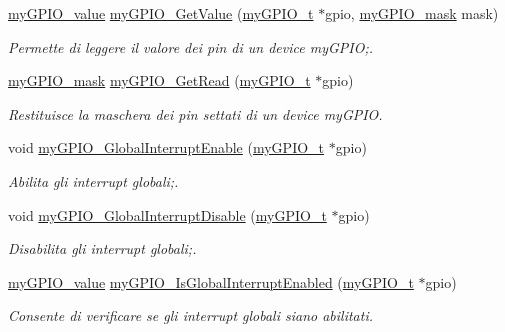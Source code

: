 \begin{DoxyCompactItemize}
\hyperlink{group__bare-metal_gaf634fe4a0e1eab8da5000b72d6ad362b}{my\+G\+P\+I\+O\+\_\+value} \hyperlink{group__bare-metal_ga2a20e519816733b90204b975edc4e212}{my\+G\+P\+I\+O\+\_\+\+Get\+Value} (\hyperlink{structmy_g_p_i_o__t}{my\+G\+P\+I\+O\+\_\+t} $\ast$gpio, \hyperlink{group__bare-metal_ga402a0d20afc0cb7c25554b8b023f4253}{my\+G\+P\+I\+O\+\_\+mask} mask)
\begin{DoxyCompactList}\small\item\em Permette di leggere il valore dei pin di un device my\+G\+P\+IO;. \end{DoxyCompactList}\item 
\hyperlink{group__bare-metal_ga402a0d20afc0cb7c25554b8b023f4253}{my\+G\+P\+I\+O\+\_\+mask} \hyperlink{group__bare-metal_gac35776cd6652f7b932a132f3f6959a11}{my\+G\+P\+I\+O\+\_\+\+Get\+Read} (\hyperlink{structmy_g_p_i_o__t}{my\+G\+P\+I\+O\+\_\+t} $\ast$gpio)
\begin{DoxyCompactList}\small\item\em Restituisce la maschera dei pin settati di un device my\+G\+P\+IO. \end{DoxyCompactList}\item 
void \hyperlink{group__bare-metal_gada93ef6a9818e634f0a233ce14582216}{my\+G\+P\+I\+O\+\_\+\+Global\+Interrupt\+Enable} (\hyperlink{structmy_g_p_i_o__t}{my\+G\+P\+I\+O\+\_\+t} $\ast$gpio)
\begin{DoxyCompactList}\small\item\em Abilita gli interrupt globali;. \end{DoxyCompactList}\item 
void \hyperlink{group__bare-metal_gaacca2871ac57a166e62bf431a2da7548}{my\+G\+P\+I\+O\+\_\+\+Global\+Interrupt\+Disable} (\hyperlink{structmy_g_p_i_o__t}{my\+G\+P\+I\+O\+\_\+t} $\ast$gpio)
\begin{DoxyCompactList}\small\item\em Disabilita gli interrupt globali;. \end{DoxyCompactList}\item 
\hyperlink{group__bare-metal_gaf634fe4a0e1eab8da5000b72d6ad362b}{my\+G\+P\+I\+O\+\_\+value} \hyperlink{group__bare-metal_ga0a753db3d02ad08014e4b7304e0f1829}{my\+G\+P\+I\+O\+\_\+\+Is\+Global\+Interrupt\+Enabled} (\hyperlink{structmy_g_p_i_o__t}{my\+G\+P\+I\+O\+\_\+t} $\ast$gpio)
\begin{DoxyCompactList}\small\item\em Consente di verificare se gli interrupt globali siano abilitati. \end{DoxyCompactList}\item 

\end{DoxyCompactItemize}
